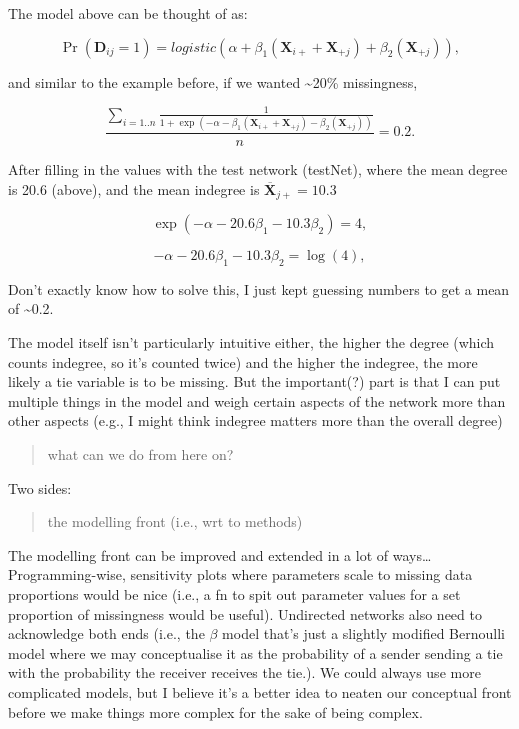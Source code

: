\documentclass[
]{article}
\begin{document}
The model above can be thought of as:

\[\Pr(\mathbf{D}_{ij} = 1) = logistic(\alpha + \beta_1(\mathbf{X}_{i+} + \mathbf{X}_{+j}) + \beta_2(\mathbf{X}_{+j})),\]

and similar to the example before, if we wanted \textasciitilde20\%
missingness,

\[\frac{\sum_{i = 1..n} \frac{1}{1 + \exp(-\alpha - \beta_1(\mathbf{X}_{i+} + \mathbf{X}_{+j}) - \beta_2(\mathbf{X}_{+j}))}}{n} = 0.2.\]

After filling in the values with the test network (testNet), where the
mean degree is 20.6 (above), and the mean indegree is
\(\mathbf{\overline{X}}_{j+} = 10.3\)

\[\exp(-\alpha - 20.6\beta_1 - 10.3\beta_2) = 4,\]

\[-\alpha - 20.6\beta_1 - 10.3\beta_2= \log(4),\]

Don't exactly know how to solve this, I just kept guessing numbers to
get a mean of \textasciitilde0.2.

The model itself isn't particularly intuitive either, the higher the
degree (which counts indegree, so it's counted twice) and the higher the
indegree, the more likely a tie variable is to be missing. But the
important(?) part is that I can put multiple things in the model and
weigh certain aspects of the network more than other aspects (e.g., I
might think indegree matters more than the overall degree)

\begin{quote}
what can we do from here on?
\end{quote}

Two sides:

\begin{quote}
the modelling front (i.e., wrt to methods)
\end{quote}

The modelling front can be improved and extended in a lot of
ways\ldots{} Programming-wise, sensitivity plots where parameters scale
to missing data proportions would be nice (i.e., a fn to spit out
parameter values for a set proportion of missingness would be useful).
Undirected networks also need to acknowledge both ends (i.e., the
\(\beta\) model that's just a slightly modified Bernoulli model where we
may conceptualise it as the probability of a sender sending a tie with
the probability the receiver receives the tie.). We could always use
more complicated models, but I believe it's a better idea to neaten our
conceptual front before we make things more complex for the sake of
being complex.
\end{document}
